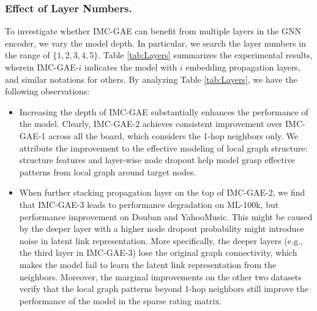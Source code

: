 \documentclass[sigconf]{acmart}
\begin{document}
\subsubsection{Effect of Layer Numbers.} To investigate whether IMC-GAE can benefit from multiple layers in the GNN encoder, we vary the model depth. In particular, we search the layer numbers in the range of $\{1, 2, 3, 4, 5\}$. Table \ref{tab:Layers} summarizes the experimental results, wherein IMC-GAE-$i$ indicates the model with $i$ embedding propagation layers, and similar notations for others. By analyzing Table 
\ref{tab:Layers}, we have the following observations:
\begin{itemize}[leftmargin=*]
    \item Increasing the depth of IMC-GAE substantially enhances the performance of the model. Clearly, IMC-GAE-2 achieves consistent improvement over IMC-GAE-1 across all the board, which considers the 1-hop neighbors only. We attribute the improvement to the effective modeling of local graph structure: structure features and layer-wise node dropout help model grasp effective patterns from local graph around target nodes.
    \item When further stacking propagation layer on the top of IMC-GAE-2, we find that IMC-GAE-3 leads to performance degradation on ML-100k, but performance improvement on Douban and YahooMusic. This might be caused by the deeper layer with a higher node dropout probability might introduce noise in latent link representation. More specifically, the deeper layers (e.g., the third layer in IMC-GAE-3) lose the original graph connectivity, which makes the model fail to learn the latent link representation from the neighbors. Moreover, the marginal improvements on the other two datasets verify that the local graph patterns beyond 1-hop neighbors still improve the performance of the model in the sparse rating matrix.   
\end{itemize}
\end{document}
